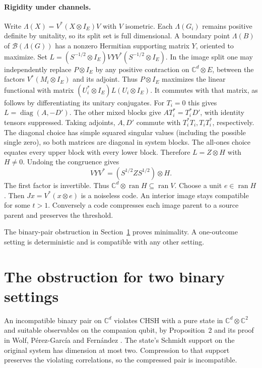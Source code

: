 \documentclass[10pt,a4paper]{article}
\newcommand{\C}{\mathbb C}
\begin{document}
\paragraph{Rigidity under channels.}
Write \(\Lambda(X)=V^*(X\otimes I_E)V\) with \(V\) isometric. Each \(\Lambda(G_i)\) remains positive definite by unitality, so its split set is full dimensional. A boundary
point \(\Lambda(B)\) of \(\mathcal B(\Lambda(G))\) has a nonzero Hermitian
supporting matrix \(Y\), oriented to maximize. Set
\(L=(S^{-1/2}\otimes I_E)VYV^*(S^{-1/2}\otimes I_E)\).
In the image split one may independently replace \(P\otimes I_E\) by any
positive contraction on \(\C^d\otimes E\), between the factors
\(V^*(M_i\otimes I_E)\) and its adjoint. Thus \(P\otimes I_E\) maximizes
the linear functional with matrix \((U_i^*\otimes I_E)L(U_i\otimes I_E)\).
It commutes with that matrix, as follows by differentiating its unitary
conjugates. For \(T_i=0\) this gives \(L=\operatorname{diag}(A,-D')\).
The other mixed blocks give \(A T_i^*=T_i^*D'\), with identity tensors
suppressed. Taking adjoints, \(A,D'\) commute with \(T_i^*T_i,T_iT_i^*\),
respectively. The diagonal choice has simple squared singular values
(including the possible single zero), so both matrices are diagonal in
system blocks. The all-ones choice equates every upper block with every
lower block. Therefore \(L=Z\otimes H\) with \(H\ne0\).
Undoing the congruence gives
\[
 VYV^*=(S^{1/2}ZS^{1/2})\otimes H .
\]
The first factor is invertible. Thus \(\C^d\otimes\operatorname{ran}H\subseteq
\operatorname{ran}V\). Choose a unit \(e\in\operatorname{ran}H\).
Then \(Jx=V^*(x\otimes e)\) is a noiseless code. An interior image stays
compatible for some \(t>1\). Conversely a code compresses each image
parent to a source parent and preserves the threshold.

The binary-pair obstruction in Section~\ref{sec:lower} proves minimality. A one-outcome setting is deterministic and is compatible with any other setting.

\section{The obstruction for two binary settings}\label{sec:lower}
An incompatible binary pair on \(\C^d\) violates CHSH with a pure state in \(\C^d\otimes\C^2\) and suitable observables on the companion qubit, by Proposition~2 and its proof in Wolf, P\'erez-Garc\'ia and Fern\'andez \cite{wolf}. The state's Schmidt support on the original system has dimension at most two. Compression to that support preserves the violating correlations, so the compressed pair is incompatible.
\end{document}
